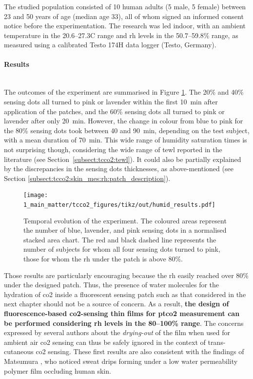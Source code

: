 The studied population consisted of 10 human adults (5 male, 5 female) between 23 and 50 years of age (median age 33), all of whom signed an informed consent notice before the experimentation. The research was led indoor, with an ambient temperature in the {20.6--27.3}{\degree}C range and \gls{rh} levels in the {50.7--59.8}\% range, as measured using a calibrated Testo 174H data logger (Testo, Germany).

\paragraph{Results}\mbox{}\\

The outcomes of the experiment are summarised in Figure \ref{fig:tcco2:humid_results}. The 20\% and 40\% sensing dots all turned to pink or lavender within the first 10~min after application of the patches, and the 60\% sensing dots all turned to pink or lavender after only 20~min. However, the change in colour from blue to pink for the 80\% sensing dots took between 40 and 90~min, depending on the test subject, with a mean duration of 70~min. This wide range of humidity saturation times is not surprising though, considering the wide range of \gls{tewl} reported in the literature (see Section~\ref{subsect:tcco2:tewl}). It could also be partially explained by the discrepancies in the sensing dots thicknesses, as above-mentioned (see Section \ref{subsect:tcco2:skin_mes:rh:patch_description}).

\begin{figure}
	\centering
	\texttt{[image: 1\_main\_matter/tcco2\_figures/tikz/out/humid\_results.pdf]}
	\caption[Temporal evolution of the humidity sensing patches.]{Temporal evolution of the experiment. The coloured areas represent the number of blue, lavender, and pink sensing dots in a normalised stacked area chart. The red and black dashed line represents the number of subjects for whom all four sensing dots turned to pink, \ie{} those for whom the \gls{rh} under the patch is above 80\%.}
	\label{fig:tcco2:humid_results}
\end{figure}

Those results are particularly encouraging because the \gls{rh} easily reached over 80\% under the designed patch. Thus, the presence of water molecules for the hydration of \gls{co2} inside a fluorescent sensing patch such as that considered in the next chapter should not be a source of concern. As a result, \textbf{the design of fluorescence-based \gls{co2}-sensing thin films for \gls{ptco2} measurement can be performed considering \gls{rh} levels in the 80--100\% range}. The concerns expressed by several authors\cite{mills1997, malins1998, segawa2003, ge2003, fernandezsanchez2007, dansby2010} about the \emph{drying-out} of the film when used for ambient air \gls{co2} sensing can thus be safely ignored in the context of trans-cutaneous \gls{co2} sensing. These first results are also consistent with the findings of Matsumura \etal{}\cite{matsumura1995}, who noticed sweat drips forming under a low water permeability polymer film occluding human skin.

